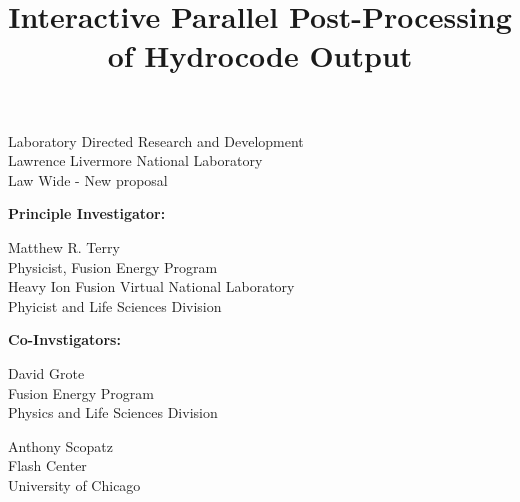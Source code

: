 \documentclass[letterpaper,11pt]{article}
\title{\color{red}Interactive Parallel Post-Processing of Hydrocode Output }
\author{}
\date{}
\begin{document}
\maketitle

\setlength{\parindent}{0pt}
\large
Laboratory Directed Research and Development \\
Lawrence Livermore National Laboratory \\
Law Wide - New proposal

\normalsize
\begin{multicols}{2}
\textbf{Principle Investigator:}
\columnbreak

Matthew R. Terry \\
Physicist, Fusion Energy Program \\
Heavy Ion Fusion Virtual National Laboratory \\
Phyicist and Life Sciences Division

\end{multicols}


\textbf{Co-Invstigators:}
\begin{multicols}{2}
	David Grote \\
	Fusion Energy Program \\
	Physics and Life Sciences Division\\
	\columnbreak
			
	Anthony Scopatz \\
	Flash Center \\
	University of Chicago \\
\end{multicols}




\end{document}
